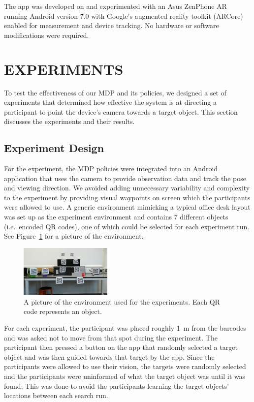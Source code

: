\documentclass[a4paper, twoside]{article}
\begin{document}
The app was developed on and experimented with an Asus ZenPhone AR running Android version 7.0 with Google's augmented reality toolkit (ARCore) enabled for measurement and device tracking. No hardware or software modifications were required.

\section{\uppercase{Experiments}}\label{sec:experiments}

\noindent To test the effectiveness of our MDP and its policies, we designed a set of experiments that determined how effective the system is at directing a participant to point the device's camera towards a target object. This section discusses the experiments and their results. 

\subsection{Experiment Design}

\noindent For the experiment, the MDP policies were integrated into an Android application that uses the camera to provide observation data and track the pose and viewing direction. We avoided adding unnecessary variability and complexity to the experiment by providing visual waypoints on screen which the participants were allowed to use. A generic environment mimicking a typical office desk layout was set up as the experiment environment and contains 7 different objects (i.e.\ encoded QR codes), one of which could be selected for each experiment run. See Figure~\ref{fig:env-picture} for a picture of the environment. 

\begin{figure}
  \centering
  \includegraphics[width=0.4\textwidth]{figures/test_env_picture.jpg}
  \caption{A picture of the environment used for the experiments. Each QR code represents an object.}\label{fig:env-picture}
\end{figure}

For each experiment, the participant was placed roughly \SI{1}{\meter} from the barcodes and was asked not to move from that spot during the experiment. The participant then pressed a button on the app that randomly selected a target object and was then guided towards that target by the app. Since the participants were allowed to use their vision, the targets were randomly selected and the participants were uninformed of what the target object was until it was found. This was done to avoid the participants learning the target objects' locations between each search run.
\end{document}
